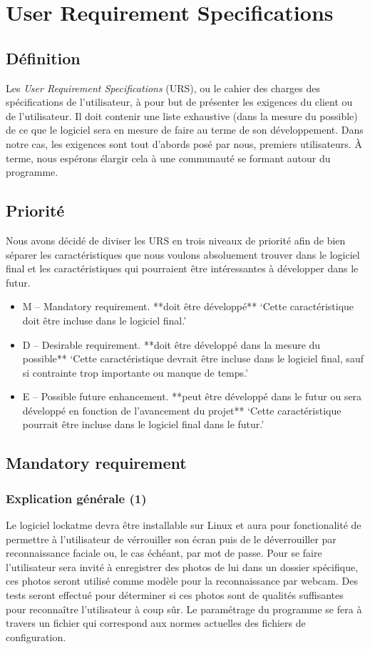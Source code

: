 \chapter{User Requirement Specifications}
\newpage

\section{Définition}
Les \emph{User Requirement Specifications} (URS), ou le cahier des charges des
spécifications de l’utilisateur, à pour but de présenter les exigences du
client ou de l’utilisateur. Il doit contenir une liste exhaustive
(dans la mesure du possible) de ce que le logiciel sera en mesure de faire au
terme de son développement. Dans notre cas, les exigences sont tout d’abords
posé par nous, premiers utilisateurs. À terme, nous espérons élargir cela à
une communauté se formant autour du programme.

\section{Priorité}
Nous avons décidé de diviser les URS en trois niveaux de priorité afin de bien
séparer les caractéristiques que nous voulons absoluement trouver dans le
logiciel final et les caractéristiques qui pourraient être intéressantes à
développer dans le futur.
\begin{itemize}
  \item{M – Mandatory requirement. **doit être développé**
‘Cette caractéristique doit être incluse dans le logiciel final.’}
  \item{D – Desirable requirement. **doit être développé dans la mesure du
  possible**
‘Cette caractéristique devrait être incluse dans le logiciel final, sauf si
contrainte trop importante ou manque de temps.’}
  \item{E – Possible future enhancement. **peut être développé dans le futur
  ou sera développé en fonction de l’avancement du projet**
‘Cette caractéristique pourrait être incluse dans le logiciel final dans le
futur.’}
\end{itemize}

\section{Mandatory requirement}
  \subsection{Explication générale (1)}
Le logiciel lockatme devra être installable sur Linux et aura pour
fonctionalité de permettre à l’utilisateur de vérrouiller son écran puis de
le déverrouiller par reconnaissance faciale ou, le cas échéant, par mot de
passe. Pour se faire l’utilisateur sera invité à enregistrer des photos de
lui dans un dossier spécifique, ces photos seront utilisé comme modèle pour la
reconnaissance par webcam. Des tests seront effectué pour déterminer si ces
photos sont de qualités suffisantes pour reconnaître l’utilisateur à coup sûr.
Le paramétrage du programme se fera à travers un fichier qui correspond aux
normes actuelles des fichiers de configuration.

